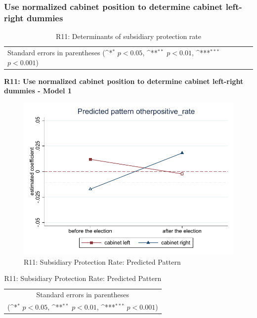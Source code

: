 \documentclass[10pt,a4paper]{scrartcl}
\begin{document}


\clearpage
\FloatBarrier
\subsubsection{Use normalized cabinet position to determine cabinet left-right dummies}
\begin{table}[!ht]\centering
	\renewcommand{\arraystretch}{1.25}
	\small
	\def\sym#1{\ifmmode^{#1}\else\(^{#1}\)\fi}
	\caption{R11: Determinants of subsidiary protection rate}
	\begin{tabular}{l*{3}{c}}
		\hline\hline
		
		\hline\hline
		\multicolumn{4}{l}{\footnotesize Standard errors in parentheses (\sym{*} \(p<0.05\), \sym{**} \(p<0.01\), \sym{***} \(p<0.001\))}\\
	\end{tabular}
\end{table}

\clearpage
\textbf{R11: Use normalized cabinet position to determine cabinet left-right dummies - Model 1}
\begin{figure}[!ht]
	\centering
	\includegraphics[width=1\textwidth]{figures_edited/otherpositive_rate_graph1_R11.pdf}
	\caption{R11: Subsidiary Protection Rate: Predicted Pattern}
\end{figure}

\begin{table}[!ht]\centering
	\renewcommand{\arraystretch}{1.25}
	\def\sym#1{\ifmmode^{#1}\else\(^{#1}\)\fi}
	\caption{R11: Subsidiary Protection Rate: Predicted Pattern}
	\begin{tabular}{l*{2}{c}}
		\hline\hline
		
		\hline\hline
		\multicolumn{3}{c}{\footnotesize Standard errors in parentheses} \\
		\multicolumn{3}{c}{\footnotesize (\sym{*} \(p<0.05\), \sym{**} \(p<0.01\), \sym{***} \(p<0.001\))}\\
	\end{tabular}
\end{table}
\end{document}
